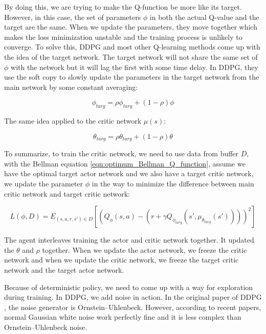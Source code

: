 \documentclass[conference]{IEEEtran}
\begin{document}
By doing this, we are trying to make the Q-function be more like its target. However, in this case, the set of parameters $\phi$ in both the actual Q-value and the target are the same. When we update the parameters, they move together which makes the loss minimization unstable and the training process is unlikely to converge. To solve this, DDPG and most other Q-learning methods come up with the idea of the target network. The target network will not share the same set of $\phi$ with the network but it will lag the first with some time delay. In DDPG, they use the soft copy to slowly update the parameters in the target network from the main network by some constant averaging: 

\begin{equation}
    \phi_{targ} = \rho \phi_{targ}  + (1- \rho) \phi
\end{equation}

The same idea applied to the critic network $\mu(s)$: 

\begin{equation}
    \theta_{targ} = \rho \theta_{targ}  + (1- \rho) \theta
\end{equation}

To summarize, to train the critic network, we need to use data from buffer $D$, with the Bellman equation \ref{eqn:optimum_Bellman_Q_function}, assume we have the optimal target actor network and we also have a target critic network, we update the parameter $\phi$ in the way to minimize the difference between main critic network and target critic network:

\begin{equation}
    L(\phi, D) = E_{(s,a,r,s') \in D}  [(Q_\phi(s,a) - (r + \gamma Q_{\phi_{targ}} (s',\mu_{\theta_{targ}}(s'))))^2]   
\end{equation}

The agent interleaves training the actor and critic network together. It updated the $\theta$ and $\rho$ together. When we update the actor network, we freeze the critic network and when we update the critic network, we freeze the target critic network and the target actor network. 

Because of deterministic policy, we need to come up with a way for exploration during training. In DDPG, we add noise in action. In the original paper of DDPG \cite{Lillicrap2016}, the noise generator is Ornstein–Uhlenbeck. However, according to recent papers, normal Gaussian white noise work perfectly fine and it is less complex than Ornstein–Uhlenbeck noise. 
\end{document}
